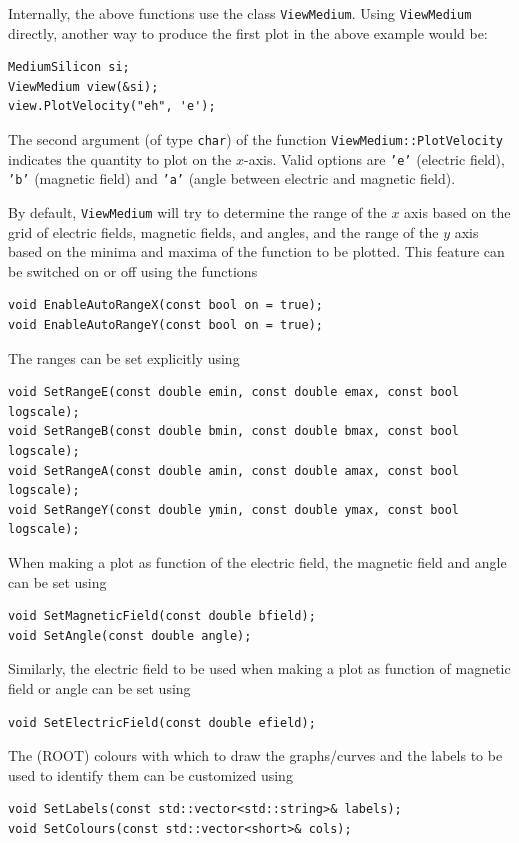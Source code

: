 Internally, the above functions use the class \texttt{ViewMedium}. 
Using \texttt{ViewMedium} directly, another way to produce the first plot 
in the above example would be:
\begin{lstlisting}
MediumSilicon si;
ViewMedium view(&si);
view.PlotVelocity("eh", 'e');
\end{lstlisting}
The second argument (of type \texttt{char}) of the function \texttt{ViewMedium::PlotVelocity} indicates the quantity to plot on the $x$-axis. 
Valid options are \texttt{'e'} (electric field), \texttt{'b'} (magnetic field) and \texttt{'a'} (angle between electric and magnetic field). 

By default, \texttt{ViewMedium} will try to determine the range of the 
$x$ axis based on the grid of electric fields, magnetic fields, 
and angles, and the range of the $y$ axis based on the 
minima and maxima of the function to be plotted. This feature can be 
switched on or off using the functions
\begin{lstlisting}
void EnableAutoRangeX(const bool on = true);
void EnableAutoRangeY(const bool on = true);
\end{lstlisting}
The ranges can be set explicitly using
\begin{lstlisting}
void SetRangeE(const double emin, const double emax, const bool logscale);
void SetRangeB(const double bmin, const double bmax, const bool logscale);
void SetRangeA(const double amin, const double amax, const bool logscale);
void SetRangeY(const double ymin, const double ymax, const bool logscale);
\end{lstlisting}
When making a plot as function of the electric field, the magnetic field 
and angle can be set using
\begin{lstlisting}
void SetMagneticField(const double bfield);
void SetAngle(const double angle);
\end{lstlisting}
Similarly, the electric field to be used when making a plot as 
function of magnetic field or angle can be set using
\begin{lstlisting}
void SetElectricField(const double efield);
\end{lstlisting}

The (ROOT) colours with which to draw the graphs/curves and the labels
to be used to identify them can be customized using
\begin{lstlisting}
void SetLabels(const std::vector<std::string>& labels);
void SetColours(const std::vector<short>& cols);
\end{lstlisting}

